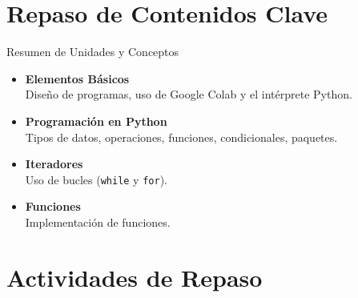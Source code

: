 \documentclass[10pt]{beamer}
\begin{document}
\section{Repaso de Contenidos Clave}

\begin{frame}{Resumen de Unidades y Conceptos}
  \begin{itemize}
    \item \textbf{Elementos Básicos} \\ 
      Diseño de programas, uso de Google Colab y el intérprete Python.
    \item \textbf{Programación en Python} \\ 
      Tipos de datos, operaciones, funciones, condicionales, paquetes.
    \item \textbf{Iteradores} \\ 
      Uso de bucles (\texttt{while} y \texttt{for}).
    \item \textbf{Funciones} \\ 
      Implementación de funciones.
  \end{itemize}
\end{frame}

\section{Actividades de Repaso}
\end{document}
